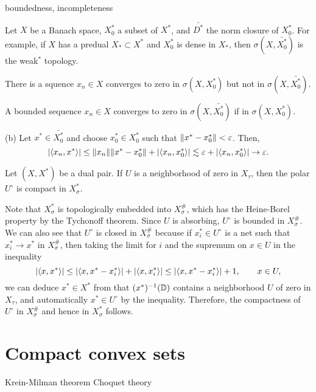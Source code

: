 \documentclass{../../large}
\begin{document}
boundedness, incompleteness



\begin{prb}
Let $X$ be a Banach space, $X_0^*$ a subset of $X^*$, and $\bar{D^*}$ the norm closure of $X_0^*$.
For example, if $X$ has a predual $X_*\subset X^*$ and $X_0^*$ is dense in $X_*$, then $\sigma(X,\bar{X_0^*})$ is the weak$^*$ topology.
\begin{parts}
\item There is a squence $x_n\in X$ converges to zero in $\sigma(X,X_0^*)$ but not in $\sigma(X,\bar{X_0^*})$.
\item A bounded sequence $x_n\in X$ converges to zero in $\sigma(X,\bar{X_0^*})$ if in $\sigma(X,X_0^*)$.
\end{parts}
\end{prb}
\begin{pf}
(b)
Let $x^*\in\bar{X_0^*}$ and choose $x_0^*\in X_0^*$ such that $\|x^*-x_0^*\|<\varepsilon$.
Then,
\[|\langle x_n,x^*\rangle|\le\|x_n\|\|x^*-x_0^*\|+|\langle x_n,x_0^*\rangle|\lesssim\varepsilon+|\langle x_n,x_0^*\rangle|\to\varepsilon.\]
\end{pf}



\begin{prb}
Let $(X,X^*)$ be a dual pair.
If $U$ is a neighborhood of zero in $X_\tau$, then the polar $U^\circ$ is compact in $X^*_\sigma$.
\end{prb}
\begin{pf}
Note that $X^*_\sigma$ is topologically embedded into $X^\#_\sigma$, which has the Heine-Borel property by the Tychonoff theorem.
Since $U$ is absorbing, $U^\circ$ is bounded in $X^\#_\sigma$.
We can also see that $U^\circ$ is closed in $X^\#_\sigma$ because if $x_i^*\in U^\circ$ is a net such that $x_i^*\to x^*$ in $X^\#_\sigma$, then taking the limit for $i$ and the supremum on $x\in U$ in the inequality
\[|\langle x,x^*\rangle|\le|\langle x,x^*-x^*_i\rangle|+|\langle x,x_i^*\rangle|\le|\langle x,x^*-x^*_i\rangle|+1,\qquad x\in U,\]
we can deduce $x^*\in X^*$ from that $(x^*)^{-1}(\mathbb{D})$ contains a neighborhood $U$ of zero in $X_\tau$, and automatically $x^*\in U^\circ$ by the inequality.
Therefore, the compactness of $U^\circ$ in $X_\sigma^\#$ and hence in $X_\sigma^*$ follows.
\end{pf}




\section{Compact convex sets}
Krein-Milman theorem
Choquet theory
\end{document}
